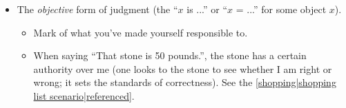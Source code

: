 \begin{itemize}
\begin{itemize}
\begin{itemize}
    \end{itemize}
    \item The \emph{objective} form of judgment (the ``$x$ is ...'' or ``$x$ = ...'' for some object $x$). \begin{itemize}
    \item Mark of what you've made yourself responsible to.
    \item When saying ``That stone is 50 pounds.'', the stone has a certain authority over me (one looks to the stone to see whether I am right or wrong; it sets the standards of correctness). See the \ref{shopping|shopping list scenario|referenced}.
    \end{itemize}
    \end{itemize}
    \end{itemize}
